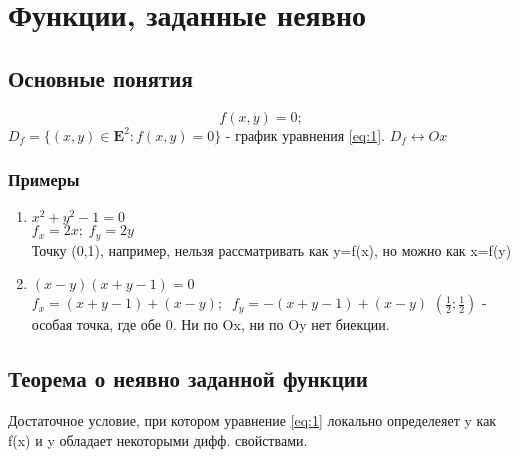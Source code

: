 \documentclass{letnab}
\begin{document}
\setcounter{section}{0}
\section{Функции, заданные неявно}
\subsection{Основные понятия}
\begin{equation} \label{eq:1}\
f(x,y)=0; 
\end{equation}
$D_{f}=\{(x,y)\in\mathbf{E}^2: f(x,y)=0 \} $  - график уравнения \ref{eq:1}. $D_f \leftrightarrow Ox$

\begin{minipage}{50mm}
	\begin{figure}[H]
	\end{figure}
\end{minipage}

\begin{minipage}{120mm}
	\subsubsection{Примеры}
	\begin{enumerate}
		\item $x^2+y^2-1=0$ \\
		$f_x=2x; \; f_y=2y$ \\
		Точку (0,1), например, нельзя рассматривать как y=f(x), но можно как x=f(y)
		\item$ (x-y)(x+y-1)=0$ \\
		$f_x=(x+y-1)+(x-y); \;\; f_y=-(x+y-1)+(x-y)$
		$(\frac 1 2;\frac 1 2)$ - особая точка, где обе 0.  Ни по Ox, ни по Oy нет биекции.
	\end{enumerate}
\end{minipage}

\subsection{Теорема о неявно заданной функции}
Достаточное условие, при котором уравнение \ref{eq:1} локально определеяет y как f(x) и y обладает некоторыми дифф. свойствами.
\end{document}
